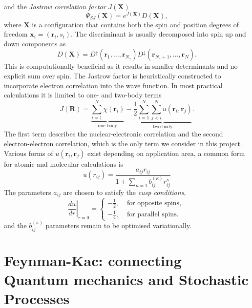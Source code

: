 and the \emph{Jastrow correlation factor} $J(\mathbf{X})$
\begin{equation}
	\Psi_{SJ}(\mathbf{X})=e^{J(\mathbf{X})} D(\mathbf{X}),
\end{equation}
where $\mathbf{X}$ is a configuration that contains both the spin and position degrees of freedom $\mathbf{x}_i = (\mathbf{r}_i, s_i)$. The discriminant is usually decomposed into spin up and down components as
\begin{equation}
	D(\mathbf{X}) = D^{\uparrow}\left(\mathbf{r}_{1}, \ldots, \mathbf{r}_{N_{\uparrow}}\right) D^{\downarrow}\left(\mathbf{r}_{N_{\uparrow}+1}, \ldots, \mathbf{r}_{N}\right).
\end{equation}
This is computationally beneficial as it results in smaller determinants and no explicit sum over spin.
The Jastrow factor is heuristically constructed to incorporate electron correlation into the wave function. In most practical calculations it is limited to one- and two-body terms~\cite{foulkes2001quantum}
\begin{equation}
	\label{eq:jast}
	J(\mathbf{R})=
	\underbrace{\sum_{i=1}^{N} \chi\left(\mathbf{r}_{i}\right)}_{\text{one-body}}
	-
	\underbrace{\frac{1}{2} \sum_{i=1}^{N} \sum_{j<i}^{N} u\left(\mathbf{r}_{i}, \mathbf{r}_{j}\right)}_{\text{two-body}}.
\end{equation}
The first term describes the nuclear-electronic correlation and the second electron-electron correlation, which is the only term we consider in this project.
Various forms of $u(\mathbf{r}_{i}, \mathbf{r}_{j})$ exist depending on application area, a common form for atomic and molecular calculations is
\begin{equation}
	\label{eq:u}
	u(r_{ij})=\frac{a_{ij} r_{ij}}{1+\sum_{\kappa=1} b^{(\kappa)}_{ij} r^\kappa_{ij}}
\end{equation}
The parameters $a_{ij}$ are chosen to satisfy the \emph{cusp conditions},  
\begin{equation}
	\left.\frac{d u}{d r}\right|_{r=0}=\left\{\begin{array}{cl}-\frac{1}{2}, & \text { for opposite spins, } \\ -\frac{1}{4}, & \text { for parallel spins. }\end{array}\right.
\end{equation}
and the $b^{(\kappa)}_{ij}$ parameters remain to be optimised variationally.


\newpage
\section{Feynman-Kac: connecting Quantum mechanics and Stochastic Processes}
\label{subsec:FK}

